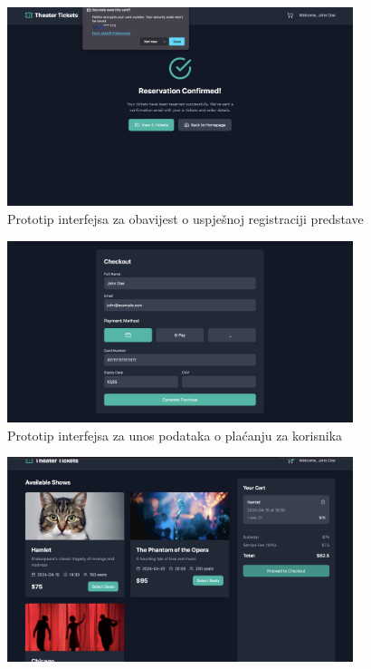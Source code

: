 \begin{itemize}
\begin{figure}[H]
    \includegraphics[width=0.9\textwidth]{Slike/FZ2ui/usercomplete.png}
    \caption{Prototip interfejsa za obavijest o uspješnoj registraciji predstave}
    \label{fig:userview}
\end{figure}
\begin{figure}[H]
    \centering
    \includegraphics[width=0.9\textwidth]{Slike/FZ2ui/usercheckout.png}
    \caption{Prototip interfejsa za unos podataka o plaćanju za korisnika}
    \label{fig:usercheckout}
\end{figure}
\begin{figure}[H]
    \centering
    \includegraphics[width=0.9\textwidth]{Slike/FZ2ui/userfrontlist.png}

\end{figure}
\end{itemize}
